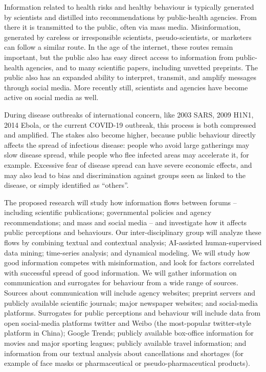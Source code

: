 


Information related to health risks and healthy behaviour is typically generated by scientists and distilled into recommendations by public-health agencies. From there it is transmitted to the public, often via mass media. Misinformation, generated by careless or irresponsible scientists, pseudo-scientists, or marketers can follow a similar route. In the age of the internet, these routes remain important, but the public also has easy direct access to information from public-health agencies, and to many scientific papers, including unvetted preprints. The public also has an expanded ability to interpret, transmit, and amplify messages through social media. More recently still, scientists and agencies have become active on social media as well.

During disease outbreaks of international concern, like 2003 SARS, 2009 H1N1, 2014 Ebola, or the current COVID-19 outbreak, this process is both compressed and amplified. The stakes also become higher, because public behaviour directly affects the spread of infectious disease: people who avoid large gatherings may slow disease spread, while people who flee infected areas may accelerate it, for example. Excessive fear of disease spread can have severe economic effects, and may also lead to bias and discrimination against groups seen as linked to the disease, or simply identified as ``others''. 

The proposed research will study how information flows between forums -- including scientific publications; governmental policies and agency recommendations; and mass and social media -- and investigate how it affects public perceptions and behaviours. 
Our inter-disciplinary group will analyze these flows by combining textual and contextual analysis; AI-assisted human-supervised data mining; time-series analysis; and dynamical modeling. We will study how good information competes with misinformation, and look for factors correlated with successful spread of good information. 
We will gather information on communication and surrogates for behaviour from a wide range of sources. 
Sources about communication will include agency websites; preprint servers and publicly available scientific journals; major newspaper websites; and social-media platforms. 
Surrogates for public perceptions and behaviour will include data from open social-media platforms twitter and Weibo (the most-popular twitter-style platform in China); Google Trends; publicly available box-office information for movies and major sporting leagues; publicly available travel information; and information  from our textual analysis about cancellations and shortages (for example of face masks or pharmaceutical or pseudo-pharmaceutical products). 

